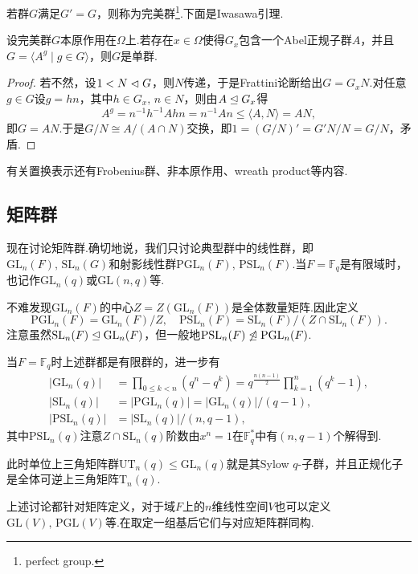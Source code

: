 若群$G$满足$G'=G$，则称为{\heiti 完美群}\footnote{perfect group.}.下面是Iwasawa引理.
\begin{lemma*}[(Iwasawa)]
	设完美群$G$本原作用在$\Omega$上.若存在$x\in\Omega$使得$G_x$包含一个Abel正规子群$A$，并且$G=\langle A^g\mid g\in G\rangle $，则$G$是单群.\hypertarget{lemma:Iwasawa}{}
\end{lemma*}
\begin{proof}
	若不然，设$1<N\vartriangleleft G$，则$N$传递，于是Frattini论断给出$G=G_xN$.对任意$g\in G$设$g=hn$，其中$h\in G_x,\,n\in N$，则由$A\trianglelefteq G_x$得
	\[
		A^g=n^{-1}h^{-1}Ahn=n^{-1}An\le\langle A,N\rangle=AN,
	\]
	即$G=AN$.于是$G/N\cong A/(A\cap N)$交换，即$1=(G/N)'=G'N/N=G/N$，矛盾.
\end{proof}

\begin{remark}
	有关置换表示还有Frobenius群、非本原作用、wreath product等内容.
\end{remark}

\subsection{矩阵群}\label{subsec:MatrixGrp}
现在讨论矩阵群.确切地说，我们只讨论典型群中的{\heiti 线性群}，即$\mathrm{GL}_n(F),\,\mathrm{SL}_n(G)$和射影线性群$\mathrm{PGL}_n(F),\,\mathrm{PSL}_n(F)$.当$F=\mathbb{F}_q$是有限域时，也记作$\mathrm{GL}_n(q)$或$\mathrm{GL}(n,q)$等.

不难发现$\mathrm{GL}_n(F)$的中心$Z=Z(\mathrm{GL}_n(F))$是全体数量矩阵.因此定义
\[
	\mathrm{PGL}_n(F)=\mathrm{GL}_n(F)/Z,\quad\mathrm{PSL}_n(F)=\mathrm{SL}_n(F)/(Z\cap\mathrm{SL}_n(F)).
\]
注意虽然$\mathrm{SL}_n(F)\trianglelefteq\mathrm{GL}_n(F)$，但一般地$\mathrm{PSL}_n(F)\not\trianglelefteq\mathrm{PGL}_n(F)$.

当$F=\mathbb{F}_q$时上述群都是有限群的，进一步有
\begin{align*}
	|\mathrm{GL}_n(q)|&=\prod_{0\le k<n}(q^n-q^k)=q^{\frac{n(n-1)}{2}}\prod_{k=1}^n(q^k-1),\\
	|\mathrm{SL}_n(q)|&=|\mathrm{PGL}_n(q)|=|\mathrm{GL}_n(q)|/(q-1),\\
	|\mathrm{PSL}_n(q)|&=|\mathrm{SL}_n(q)|/(n,q-1),
\end{align*}
其中$\mathrm{PSL}_n(q)$注意$Z\cap\mathrm{SL}_n(q)$阶数由$x^n=1$在$\mathbb{F}_q^*$中有$(n,q-1)$个解得到.

此时单位上三角矩阵群$\mathrm{UT}_n(q)\le\mathrm{GL}_n(q)$就是其Sylow $q$-子群，并且正规化子是全体可逆上三角矩阵$\mathrm{T}_n(q)$.

上述讨论都针对矩阵定义，对于域$F$上的$n$维线性空间$V$也可以定义$\mathrm{GL}(V),\,\mathrm{PGL}(V)$等.在取定一组基后它们与对应矩阵群同构.


